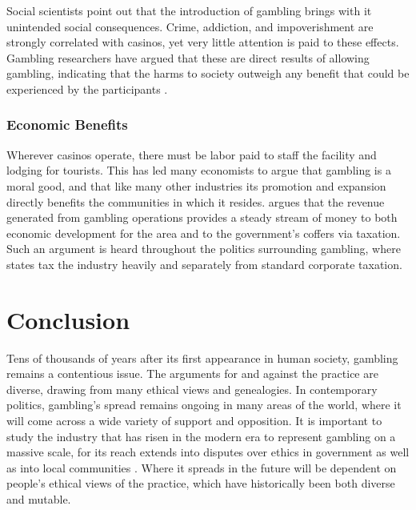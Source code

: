 \documentclass{../../../coursework}
\begin{document}
Social scientists point out that the introduction of gambling brings with it unintended social consequences. Crime, addiction, and impoverishment are strongly correlated with casinos, yet very little attention is paid to these effects. Gambling researchers have argued that these are direct results of allowing gambling, indicating that the harms to society outweigh any benefit that could be experienced by the participants \parencite{Sto99}.

\subsubsection{Economic Benefits}

Wherever casinos operate, there must be labor paid to staff the facility and lodging for tourists. This has led many economists to argue that gambling is a moral good, and that like many other industries its promotion and expansion directly benefits the communities in which it resides. \textcite{Gil12} argues that the revenue generated from gambling operations provides a steady stream of money to both economic development for the area and to the government's coffers via taxation. Such an argument is heard throughout the politics surrounding gambling, where states tax the industry heavily and separately from standard corporate taxation.

\section{Conclusion}

Tens of thousands of years after its first appearance in human society, gambling remains a contentious issue. The arguments for and against the practice are diverse, drawing from many ethical views and genealogies. In contemporary politics, gambling's spread remains ongoing in many areas of the world, where it will come across a wide variety of support and opposition. It is important to study the industry that has risen in the modern era to represent gambling on a massive scale, for its reach extends into disputes over ethics in government \parencite{Kin98} as well as into local communities \parencite{Sto99,Gil12}. Where it spreads in the future will be dependent on people's ethical views of the practice, which have historically been both diverse and mutable.

\printbibliography
\end{document}
